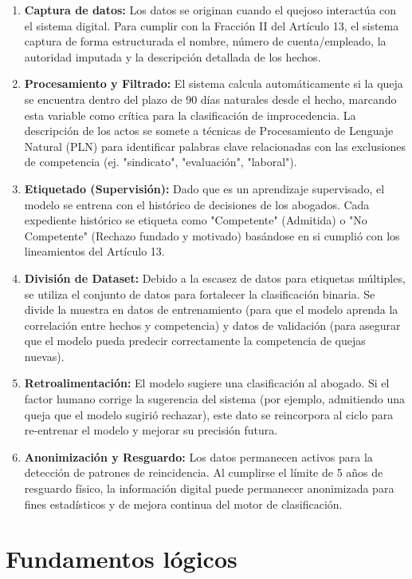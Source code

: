 \begin{enumerate}
    \item \textbf{Captura de datos:} Los datos se originan cuando el quejoso interactúa con el sistema digital. Para cumplir con la Fracción II del Artículo 13, el sistema captura de forma estructurada el nombre, número de cuenta/empleado, la autoridad imputada y la descripción detallada de los hechos.
    \item \textbf{Procesamiento y Filtrado:} El sistema calcula automáticamente si la queja se encuentra dentro del plazo de 90 días naturales desde el hecho, marcando esta variable como crítica para la clasificación de improcedencia. La descripción de los actos se somete a técnicas de Procesamiento de Lenguaje Natural (PLN) para identificar palabras clave relacionadas con las exclusiones de competencia (ej. "sindicato", "evaluación", "laboral").
    \item \textbf{Etiquetado (Supervisión):} Dado que es un aprendizaje supervisado, el modelo se entrena con el histórico de decisiones de los abogados. Cada expediente histórico se etiqueta como "Competente" (Admitida) o "No Competente" (Rechazo fundado y motivado) basándose en si cumplió con los lineamientos del Artículo 13.
    \item \textbf{División de Dataset:} Debido a la escasez de datos para etiquetas múltiples, se utiliza el conjunto de datos para fortalecer la clasificación binaria. Se divide la muestra en datos de entrenamiento (para que el modelo aprenda la correlación entre hechos y competencia) y datos de validación (para asegurar que el modelo pueda predecir correctamente la competencia de quejas nuevas).
    \item \textbf{Retroalimentación:} El modelo sugiere una clasificación al abogado. Si el factor humano corrige la sugerencia del sistema (por ejemplo, admitiendo una queja que el modelo sugirió rechazar), este dato se reincorpora al ciclo para re-entrenar el modelo y mejorar su precisión futura.
    \item \textbf{Anonimización y Resguardo:} Los datos permanecen activos para la detección de patrones de reincidencia. Al cumplirse el límite de 5 años de resguardo físico, la información digital puede permanecer anonimizada para fines estadísticos y de mejora continua del motor de clasificación.
\end{enumerate}

\section{Fundamentos lógicos}

